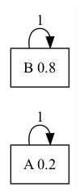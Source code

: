 \documentclass[11pt]{article}
\begin{document}
\begin{center}
\includegraphics[width=.9\linewidth]{not_strongly_connected.png}
\end{center}
\end{document}

